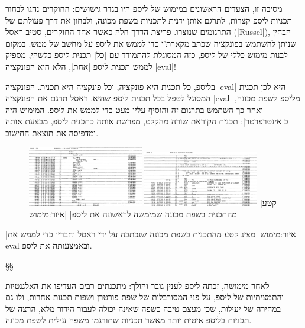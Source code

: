 מסיבה זו, הצעדים הראשונים במימוש של ליספ היו בגדר גישושים: החוקרים נהגו לבחור
תכניות ליספ קצרות, לתרגם אותן ידנית לתכניות בשפת מכונה, ולבחון את דרך פעולתם של
התרגומים שנוצרו. פריצת הדרך חלה כאשר אחד החוקרים, סטיב ראסל (\E|Russel|),
הבחין שניתן להשתמש בפונקציה  שכתב מקארת'י כדי לממש את ליספ על מחשב
של ממש. במקום לבנות מימוש כללי של ליספ, כזה המסוגלת להתמודד עם \ע|כל| תכנית
ליספ כלשהי, מספיק לממש תכנית ליספ \ע|אחת|, הלא היא הפונקציה \E|eval|!

בליספ, כל תכנית היא פונקציה, וכל פונקציה היא תכנית. הפונקציה \E|eval| היא לכן
תכנית המסוגל לטפל בכל תכנית ליספ שהיא. ראסל תרגם את הפונקציה \E|eval| מליספ
לשפת מכונה, ואחר כך השתמש בתרגום זה והוסיף עליו מעט כדי לממש את ליספ. המימוש
היה כ\ע|אינטרפרטר|: תכנית הקוראת שורה מהקלט, מפרשת אותה כתכנית ליספ, מבצעת
אותה ומדפיסה את תוצאת החישוב.

\begin{figure}[H]
\centering
\includegraphics[width=0.45\textwidth]{lisp-assembler2}
\qquad
\includegraphics[width=0.45\textwidth]{lisp-assembler1}
|קטע מהתכנית בשפת מכונה שמימשה לראשונה את ליספ|
|איור:מימוש|
\end{figure}

|איור:מימוש| מציג קטע מהתכנית בשפת מכונה שנכתבה על ידי ראסל וחבריו כדי לממש
את eval ובאמצעותה את ליספ.

§§ 

לאחר מימושה, זכתה ליספ לענין גובר והולך: מתכנתים רבים העדיפו את האלגנטיות
והתמציתיות של ליספ, על פני המסורבלות של שפת פורטרן ושפות תכנות אחרות, ולו גם
במחירה של יעילות, שכן מעצם טיבה כשפה שאינה יכולה לעבור הידור מלא, הרצה של
תכניות בליספ איטית יותר מאשר תכניות שתורגמו משפה עילית לשפת מכונה.


